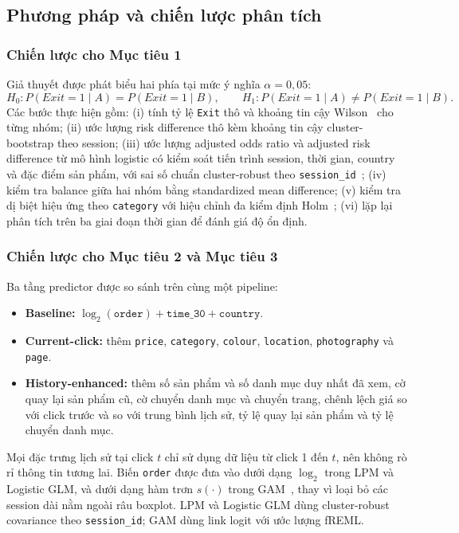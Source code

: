 \subsection{Phương pháp và chiến lược phân tích}

\subsubsection{Chiến lược cho Mục tiêu 1}

Giả thuyết được phát biểu hai phía tại mức ý nghĩa $\alpha = 0{,}05$:
\[
H_0: P(Exit=1\mid A)=P(Exit=1\mid B),
\qquad
H_1: P(Exit=1\mid A)\ne P(Exit=1\mid B).
\]
Các bước thực hiện gồm: (i) tính tỷ lệ \texttt{Exit} thô và khoảng tin cậy
Wilson~\cite{wilson1927} cho từng nhóm; (ii) ước lượng risk difference thô kèm
khoảng tin cậy cluster-bootstrap theo session; (iii) ước lượng adjusted odds
ratio và adjusted risk difference từ mô hình logistic có kiểm soát tiến trình
session, thời gian, country và đặc điểm sản phẩm, với sai số chuẩn
cluster-robust theo \texttt{session\_id}~\cite{zeileis2004, cameron2015};
(iv) kiểm tra balance giữa hai nhóm bằng standardized mean difference;
(v) kiểm tra dị biệt hiệu ứng theo \texttt{category} với hiệu chỉnh đa kiểm định
Holm~\cite{holm1979}; (vi) lặp lại phân tích trên ba giai đoạn thời gian để đánh
giá độ ổn định.

\subsubsection{Chiến lược cho Mục tiêu 2 và Mục tiêu 3}

Ba tầng predictor được so sánh trên cùng một pipeline:

\begin{itemize}
  \item \textbf{Baseline:} $\log_2(\texttt{order}) + \texttt{time\_30} + \texttt{country}$.
  \item \textbf{Current-click:} thêm \texttt{price}, \texttt{category},
  \texttt{colour}, \texttt{location}, \texttt{photography} và \texttt{page}.
  \item \textbf{History-enhanced:} thêm số sản phẩm và số danh mục duy nhất đã
  xem, cờ quay lại sản phẩm cũ, cờ chuyển danh mục và chuyển trang, chênh lệch
  giá so với click trước và so với trung bình lịch sử, tỷ lệ quay lại sản phẩm và
  tỷ lệ chuyển danh mục.
\end{itemize}

Mọi đặc trưng lịch sử tại click $t$ chỉ sử dụng dữ liệu từ click 1 đến $t$, nên
không rò rỉ thông tin tương lai. Biến \texttt{order} được đưa vào dưới dạng
$\log_2$ trong LPM và Logistic GLM, và dưới dạng hàm trơn $s(\cdot)$ trong
GAM~\cite{wood2017}, thay vì loại bỏ các session dài nằm ngoài râu boxplot. LPM
và Logistic GLM dùng cluster-robust covariance theo \texttt{session\_id}; GAM
dùng link logit với ước lượng fREML.

